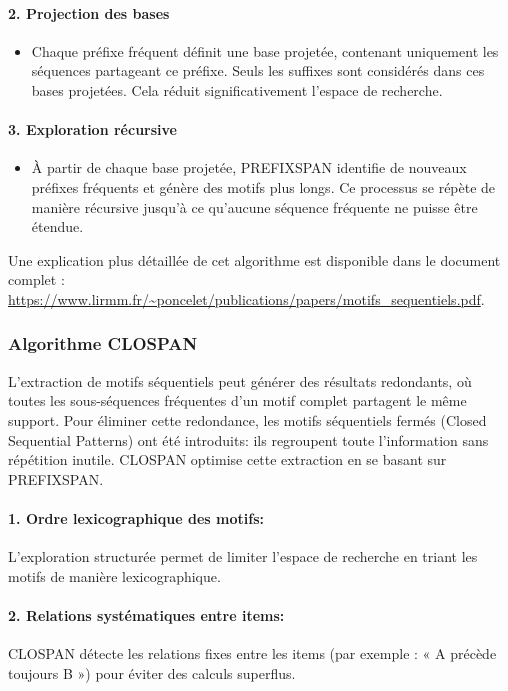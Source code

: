 \documentclass[a4paper,12pt]{article}
\begin{document}
\paragraph{2. Projection des bases}
\begin{itemize}
    \item Chaque préfixe fréquent définit une base projetée, contenant uniquement les séquences partageant ce préfixe. Seuls les suffixes sont considérés dans ces bases projetées. Cela réduit significativement l’espace de recherche.
\end{itemize}

\paragraph{3. Exploration récursive}
\begin{itemize}
    \item À partir de chaque base projetée, PREFIXSPAN identifie de nouveaux préfixes fréquents et génère des motifs plus longs. Ce processus se répète de manière récursive jusqu'à ce qu'aucune séquence fréquente ne puisse être étendue.
\end{itemize}
\vspace{0.1cm}

Une explication plus détaillée de cet algorithme est disponible dans le document complet : \url{https://www.lirmm.fr/~poncelet/publications/papers/motifs_sequentiels.pdf}.

\subsubsection{Algorithme CLOSPAN}
\label{sec:CLOSPAN}
L’extraction de motifs séquentiels peut générer des résultats redondants, où toutes les sous-séquences fréquentes d’un motif complet partagent le même support. Pour éliminer cette redondance, les motifs séquentiels fermés (Closed Sequential Patterns) ont été introduits: ils regroupent toute l’information sans répétition inutile. CLOSPAN optimise cette extraction en se basant sur PREFIXSPAN.

\paragraph{1. Ordre lexicographique des motifs:\\}
L'exploration structurée permet de limiter l’espace de recherche en triant les motifs de manière lexicographique.

\paragraph{2. Relations systématiques entre items:\\}
CLOSPAN détecte les relations fixes entre les items (par exemple : « A précède toujours B ») pour éviter des calculs superflus.
\end{document}
